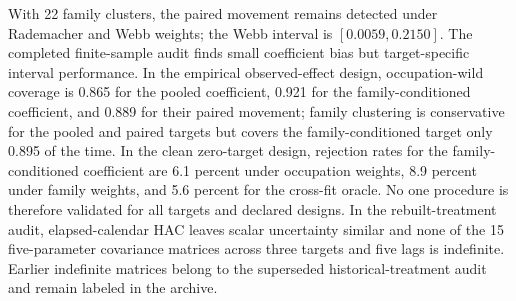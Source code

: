 

With 22 family clusters, the paired movement remains detected under Rademacher and Webb weights; the Webb interval is $[0.0059,0.2150]$.  The completed finite-sample audit finds small coefficient bias but target-specific interval performance.  In the empirical observed-effect design, occupation-wild coverage is 0.865 for the pooled coefficient, 0.921 for the family-conditioned coefficient, and 0.889 for their paired movement; family clustering is conservative for the pooled and paired targets but covers the family-conditioned target only 0.895 of the time.  In the clean zero-target design, rejection rates for the family-conditioned coefficient are 6.1 percent under occupation weights, 8.9 percent under family weights, and 5.6 percent for the cross-fit oracle.  No one procedure is therefore validated for all targets and declared designs.  In the rebuilt-treatment audit, elapsed-calendar HAC leaves scalar uncertainty similar and none of the 15 five-parameter covariance matrices across three targets and five lags is indefinite.  Earlier indefinite matrices belong to the superseded historical-treatment audit and remain labeled in the archive.
